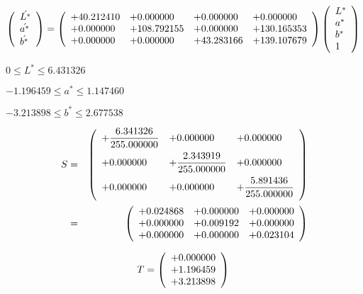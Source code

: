 \documentclass{article}
\begin{document}
\[ \left( \begin{array}{l} \acute{L^{*}} \\ \acute{a^{*}} \\ \acute{b^{*}} \\ \end{array} \right) = \left( \begin{array}{llll} +40.212410 & +0.000000 & +0.000000 & +0.000000 \\ +0.000000 & +108.792155 & +0.000000 & +130.165353 \\ +0.000000 & +0.000000 & +43.283166 & +139.107679 \\ \end{array} \right) \left( \begin{array}{l} L^{*} \\ a^{*} \\ b^{*} \\ 1 \\ \end{array} \right) \\ \]
\pagebreak

$ 0 \le L^{*} \le 6.431326 $
\pagebreak

$ -1.196459 \le a^{*} \le 1.147460 $
\pagebreak

$ -3.213898 \le b^{*} \le 2.677538 $
\pagebreak

\begin{eqnarray*} S &=& \left( \begin{array}{lll} +\dfrac{6.341326}{255.000000} & +0.000000 & +0.000000 \vspace{.5em} \\ +0.000000 & +\dfrac{2.343919}{255.000000} & +0.000000 \vspace{.5em} \\ +0.000000 & +0.000000 & +\dfrac{5.891436}{255.000000} \vspace{.5em} \\ \end{array} \right) \\ &=& \left( \begin{array}{lll} +0.024868 & +0.000000 & +0.000000 \\ +0.000000 & +0.009192 & +0.000000 \\ +0.000000 & +0.000000 & +0.023104 \\ \end{array} \right) \\ \end{eqnarray*}
\pagebreak

\[ T = \left( \begin{array}{l} +0.000000 \\ +1.196459 \\ +3.213898 \\ \end{array} \right) \\ \]
\pagebreak
\end{document}
